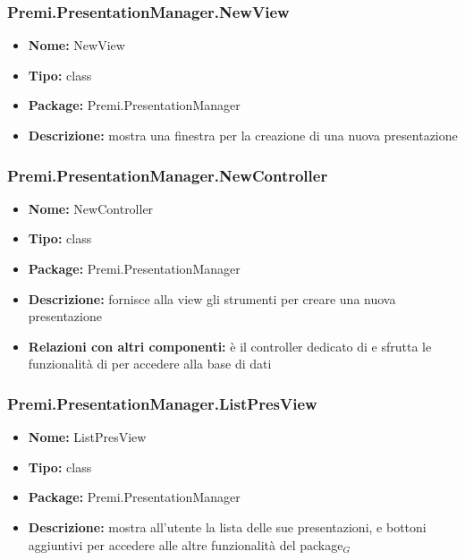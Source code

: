 \subsubsection{Premi.PresentationManager.NewView}
\begin{itemize}
  \item \textbf{Nome:} NewView
  \item \textbf{Tipo:} class
  \item \textbf{Package:} Premi.PresentationManager
  \item \textbf{Descrizione:} mostra una finestra per la creazione di una nuova presentazione
\end{itemize}
\subsubsection{Premi.PresentationManager.NewController}
\begin{itemize}
  \item \textbf{Nome:} NewController
  \item \textbf{Tipo:} class
  \item \textbf{Package:} Premi.PresentationManager
  \item \textbf{Descrizione:} fornisce alla view gli strumenti per creare una nuova presentazione
  \item \textbf{Relazioni con altri componenti:} è il controller dedicato di   e sfrutta le funzionalità di  per accedere alla base di dati
\end{itemize}
\subsubsection{Premi.PresentationManager.ListPresView}
\begin{itemize}
  \item \textbf{Nome:} ListPresView
  \item \textbf{Tipo:} class
  \item \textbf{Package:} Premi.PresentationManager
  \item \textbf{Descrizione:} mostra all'utente la lista delle sue presentazioni, e bottoni aggiuntivi per accedere alle altre funzionalità del package$_G$
\end{itemize}

